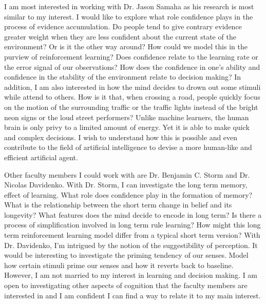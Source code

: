 \documentclass[12pt]{article}
\begin{document}
	I am most interested in working with Dr. Jason Samaha as his research is most similar to my interest. I would like to explore what role confidence plays in the process of evidence accumulation. Do people tend to give contrary evidence greater weight when they are less confident about the current state of the environment? Or is it the other way around? How could we model this in the purview of reinforcement learning? Does confidence relate to the learning rate or the error signal of our observations? How does the confidence in one’s ability and confidence in the stability of the environment relate to decision making? In addition, I am also interested in how the mind decides to drown out some stimuli while attend to others. How is it that, when crossing a road, people quickly focus on the motion of the surrounding traffic or the traffic lights instead of the bright neon signs or the loud street performers? Unlike machine learners, the human brain is only privy to a limited amount of energy. Yet it is able to make quick and complex decisions. I wish to understand how this is possible and even contribute to the field of artificial intelligence to devise a more human-like and efficient artificial agent.
	
	Other faculty members I could work with are Dr. Benjamin C. Storm and Dr. Nicolas Davidenko. With Dr. Storm, I can investigate the long term memory, effect of learning. What role does confidence play in the formation of memory? What is the relationship between the short term change in belief and its longevity? What features does the mind decide to encode in long term? Is there a process of simplification involved in long term rule learning? How might this long term reinforcement learning model differ from a typical short term version? With Dr. Davidenko, I’m intrigued by the notion of the suggestibility of perception. It would be interesting to investigate the priming tendency of our senses. Model how certain stimuli prime our senses and how it reverts back to baseline. However, I am not married to my interest in learning and decision making. I am open to investigating other aspects of cognition that the faculty members are interested in and I am confident I can find a way to relate it to my main interest.
	
\end{document}
